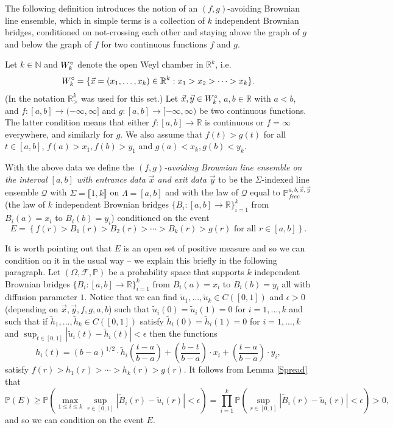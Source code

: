 The following definition introduces the notion of an $(f,g)$-avoiding Brownian line ensemble, which in simple terms is a collection of $k$ independent Brownian bridges, conditioned on not-crossing each other and staying above the graph of $g$ and below the graph of $f$ for two continuous functions $f$ and $g$.
\begin{definition}\label{DefAvoidingLaw}
Let $k \in \mathbb{N}$ and $W^\circ_k$ denote the open Weyl chamber in $\mathbb{R}^{k}$, i.e.
$$W^\circ_k = \{ \vec{x} = (x_1, \dots, x_k) \in \mathbb{R}^k: x_1 > x_2 > \cdots > x_k \}.$$
(In \cite{CorHamA} the notation $\mathbb{R}_{>}^k$ was used for this set.)
Let $\vec{x}, \vec{y} \in W^\circ_k$, $a,b \in \mathbb{R}$ with $a < b$, and $f: [a,b] \rightarrow (-\infty, \infty]$ and $g: [a,b] \rightarrow [-\infty, \infty)$ be two continuous functions. The latter condition means that either $f: [a,b] \rightarrow \mathbb{R}$ is continuous or $f = \infty$ everywhere, and similarly for $g$. We also assume that $f(t) > g(t)$ for all $t \in[a,b]$, $f(a) > x_1, f(b) > y_1$ and $g(a) < x_k, g(b) < y_k.$


With the above data we define the {\em $(f,g)$-avoiding Brownian line ensemble on the interval $[a,b]$ with entrance data $\vec{x}$ and exit data $\vec{y}$} to be the $\Sigma$-indexed line ensemble $\mathcal{Q}$ with $\Sigma = \llbracket 1, k\rrbracket$ on $\Lambda = [a,b]$ and with the law of $\mathcal{Q}$ equal to $\mathbb{P}^{a,b, \vec{x},\vec{y}}_{free}$ (the law of $k$ independent Brownian bridges $\{B_i: [a,b] \rightarrow \mathbb{R} \}_{i = 1}^k$ from $B_i(a) = x_i$ to $B_i(b) = y_i$) conditioned on the event 
$$E  = \left\{ f(r) > B_1(r) > B_2(r) > \cdots > B_k(r) > g(r) \mbox{ for all $r \in[a,b]$} \right\}.$$ 

It is worth pointing out that $E$ is an open set of positive measure and so we can condition on it in the usual way -- we explain this briefly in the following paragraph.  Let $\left(\Omega, \mathcal{F}, \mathbb{P}\right)$ be a probability space that supports $k$ independent Brownian bridges $\{B_i: [a,b] \rightarrow \mathbb{R} \}_{i = 1}^k$ from $B_i(a) = x_i$ to $B_i(b) = y_i$ all with diffusion parameter $1$. Notice that we can find $\tilde{u}_1, \dots, \tilde{u}_k \in C([0,1])$ and $\epsilon > 0$ (depending on $\vec{x}, \vec{y}, f, g, a, b$) such that $\tilde{u}_i(0) = \tilde{u}_i(1) = 0$ for $i = 1, \dots, k$ and such that if $\tilde{h}_1, \dots, \tilde{h}_k \in C([0,1])$ satisfy $\tilde{h}_i(0) = \tilde{h}_i(1) = 0$ for $i = 1, \dots, k$ and $\sup_{t \in [0,1]}|\tilde{u}_i(t) - \tilde{h}_i(t)| < \epsilon$ then the functions
$$h_i(t) = (b-a)^{1/2} \cdot \tilde{h}_i \left( \frac{t - a}{b-a} \right) + \left(\frac{b-t}{b-a} \right) \cdot x_i + \left( \frac{t- a}{b-a}\right) \cdot y_i,$$ 
satisfy $f(r) > h_1(r) > \cdots > h_k(r) > g(r)$. It follows from Lemma \ref{Spread} that 
$$\mathbb{P}(E) \geq \mathbb{P}\left(\max_{1 \leq i \leq k} \sup_{r \in [0,1]}|\tilde{B}_i(r) - \tilde{u}_i(r)| < \epsilon \right) = \prod_{i = 1}^k \mathbb{P} \left( \sup_{r \in [0,1]}|\tilde{B}_i(r) - \tilde{u}_i(r)| < \epsilon  \right)> 0,$$
 and so we can condition on the event $E$. 


\end{definition}
